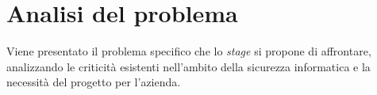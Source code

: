 \section{Analisi del problema}
Viene presentato il problema specifico che lo \textit{stage} si propone di affrontare, analizzando le criticità esistenti nell'ambito della sicurezza informatica e la necessità del progetto per l'azienda.
